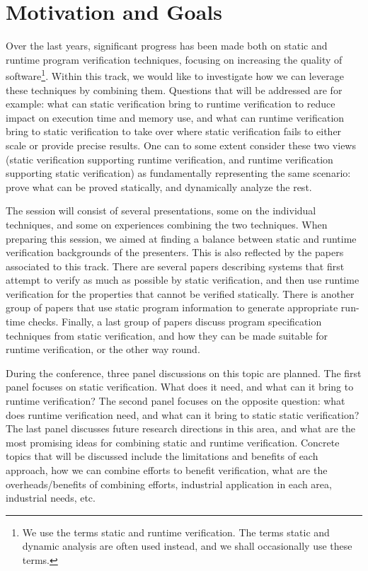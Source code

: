 
\section{Motivation and Goals}

Over the last years, significant progress has been made both on static and runtime program verification techniques, focusing on increasing the quality of software\footnote{We use the terms static and runtime verification. The terms static and dynamic analysis are often used instead, and we shall occasionally use these terms.}. Within this track, we would like to investigate how we can leverage these techniques by combining them. Questions that will be addressed are for example: what can static verification  bring to runtime verification 
to reduce impact on execution time and memory use, and what can runtime verification bring to static verification to take over where static verification fails to either scale or provide precise results. One can to some extent consider these two views (static verification supporting runtime verification, and runtime verification supporting static verification) as fundamentally representing the same scenario: prove what can be proved statically, and dynamically analyze the rest. 

The session will consist of several presentations, some on the individual techniques, and some on experiences combining the two techniques. When preparing this session, we aimed at finding a balance between static and runtime verification backgrounds of the presenters. This is also reflected by the papers associated to this track. There are several papers describing systems that first attempt to verify as much as possible by static verification, and then use runtime verification for the properties that cannot be verified statically. There is another group of papers that use static program information to generate appropriate run-time checks. Finally, a last group of papers discuss program specification techniques from static verification, and how they can be made suitable for runtime verification, or the other way round.

During the conference, three panel discussions on this topic are planned. The first panel focuses on static verification. What does it need, and what can it bring to runtime verification? The second panel focuses on the opposite question: what does runtime verification need, and what can it bring to static static verification? The last panel  discusses future research directions in this area, and what are the most promising ideas for combining static and runtime verification. Concrete topics that will be discussed include the limitations and benefits of each approach, how we can combine efforts to benefit verification, what are the overheads/benefits of combining efforts, industrial application in each area, industrial needs, etc.



